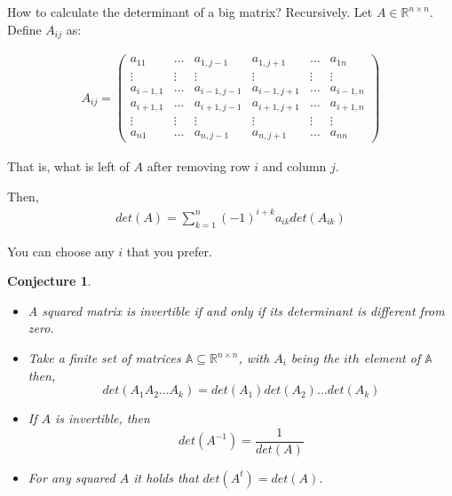 \documentclass[aspectratio=169]{beamer}
\newtheorem{proposition}{Conjecture}[section]
\begin{document}
\begin{frame}
    How to calculate the determinant of a big matrix? Recursively. Let $A\in\mathds{R}^{n\times n}$.
    Define $A_{ij}$ as:
    
    \begin{align*}
        A_{ij}=\left(
        \begin{array}{cccccc}
             a_{11} & \ldots & a_{1,j-1} & a_{1,j+1} & \ldots & a_{1n}  \\
             \vdots& \vdots & \vdots & \vdots & \vdots  & \vdots \\
             a_{i-1,1} & \ldots & a_{i-1,j-1} & a_{i-1,j+1} & \ldots & a_{i-1,n}\\
             a_{i+1,1} & \ldots & a_{i+1,j-1} & a_{i+1,j+1} & \ldots & a_{i+1,n}\\
             \vdots& \vdots & \vdots & \vdots & \vdots  & \vdots \\
             a_{n1} & \ldots & a_{n,j-1} & a_{n,j+1} & \ldots & a_{nn}  
        \end{array}
        \right)
    \end{align*}
    
    That is, what is left of $A$ after removing row $i$ and column $j$.
\end{frame}

\begin{frame}

    Then,
    \begin{align*}
        det(A)=\sum_{k=1}^n (-1)^{i+k} a_{ik} det(A_{ik})
    \end{align*}
    
    You can choose any $i$ that you prefer.
    
\end{frame}

\begin{frame}
    \begin{proposition}
    
    \begin{itemize}
        \item A squared matrix is invertible if and only if its determinant is different from zero.
        \item Take a finite set of matrices $\mathds{A}\subseteq\mathds{R}^{n\times n}$, with $A_i$ being the $ith$ element of $\mathds{A}$ then, $$det(A_1A_2\ldots A_k)=det(A_1)det(A_2)\ldots det(A_k)$$
        \item If $A$ is invertible, then $$det(A^{-1})=\frac{1}{det(A)}$$
        \item For any squared $A$ it holds that $det(A^t)=det(A)$.
    \end{itemize}
        
    \end{proposition}
    
    
    
\end{frame}
\end{document}
